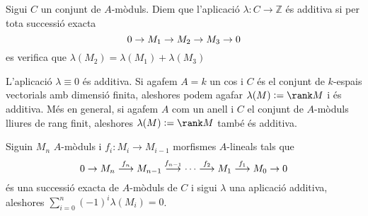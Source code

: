 \documentclass[../../../main.tex]{subfiles}
\begin{document}
\begin{defi}
Sigui $C$ un conjunt de $A$-mòduls. Diem que l'aplicació $\lambda:C\to \mathbb{Z}$ és additiva si per tota successió exacta
\begin{equation}
    \notag
    0\to M_1\to M_2\to M_3\to 0
\end{equation}
es verifica que $\lambda(M_2) = \lambda(M_1)+\lambda(M_3)$
\end{defi}

\begin{ej}
L'aplicació $\lambda\equiv 0$ és additiva. Si agafem $A = k$ un cos i $C$ és el conjunt de $k$-espais vectorials amb dimensió finita, aleshores podem agafar $\lambda(M):=\rank M$ i és additiva.
Més en general, si agafem $A$ com un anell i $C$ el conjunt de $A$-mòduls lliures de rang finit, aleshores $\lambda(M):=\rank M$ també és additiva.
\end{ej}

\begin{prop}
Siguin $M_n$ $A$-mòduls i $f_i:M_i\to M_{i-1}$ morfismes $A$-lineals tals que
\begin{equation}
    \notag
    0\to M_n\overset{f_n}{\longrightarrow}M_{n-1}\overset{f_{n-1}}{\longrightarrow}\cdots\overset{f_2}{\longrightarrow}M_1\overset{f_1}{\longrightarrow}M_0\to 0
\end{equation}
és una successió exacta de $A$-mòduls de $C$ i sigui $\lambda$ una aplicació additiva, aleshores $\sum_{i=0}^n(-1)^{i}\lambda(M_i) = 0$.
\end{prop}
\end{document}
